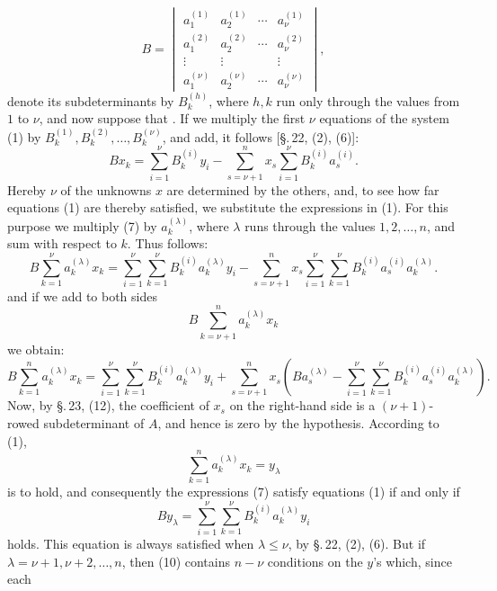 
\begin{equation}
        B=\begin{vmatrix}
        a_1^{(1)}&a_2^{(1)}&\cdots&a_\nu^{(1)}\\
        a_1^{(2)}&a_2^{(2)}&\cdots&a_\nu^{(2)}\\
        \vdots&\vdots&&\vdots\\
        a_1^{(\nu)}&a_2^{(\nu)}&\cdots&a_\nu^{(\nu)}
        \end{vmatrix},
\tag{6}
\end{equation}
denote its subdeterminants by \(B_k^{(h)}\), where \(h,k\) run only through the values from \(1\) to \(\nu\), and now suppose that . If we multiply the first \(\nu\) equations of the system (1) by \(B_k^{(1)},B_k^{(2)},\ldots,B_k^{(\nu)}\), and add, it follows [\S.\,22, (2), (6)]:
\begin{equation}
 Bx_k=\sum_{i=1}^{\nu}B_k^{(i)}y_i-
 \sum_{s=\nu+1}^{n}x_s\sum_{i=1}^{\nu}B_k^{(i)}a_s^{(i)}.
\tag{7}
\end{equation}
Hereby \(\nu\) of the unknowns \(x\) are determined by the others, and, to see how far equations (1) are thereby satisfied, we substitute the expressions in (1). For this purpose we multiply (7) by \(a_k^{(\lambda)}\), where \(\lambda\) runs through the values \(1,2,\ldots,n\), and sum with respect to \(k\). Thus follows:
\begin{equation}
 B\sum_{k=1}^{\nu}a_k^{(\lambda)}x_k
 =\sum_{i=1}^{\nu}\sum_{k=1}^{\nu}B_k^{(i)}a_k^{(\lambda)}y_i
 -\sum_{s=\nu+1}^{n}x_s\sum_{i=1}^{\nu}\sum_{k=1}^{\nu}B_k^{(i)}a_s^{(i)}a_k^{(\lambda)}.
\tag{8}
\end{equation}
and if we add to both sides
\[
 B\sum_{k=\nu+1}^{n}a_k^{(\lambda)}x_k
\]
we obtain:
\begin{equation}
 B\sum_{k=1}^{n}a_k^{(\lambda)}x_k
 =\sum_{i=1}^{\nu}\sum_{k=1}^{\nu}B_k^{(i)}a_k^{(\lambda)}y_i
 +\sum_{s=\nu+1}^{n}x_s\left(Ba_s^{(\lambda)}-
 \sum_{i=1}^{\nu}\sum_{k=1}^{\nu}B_k^{(i)}a_s^{(i)}a_k^{(\lambda)}\right).
\tag{9}
\end{equation}
Now, by \S.\,23, (12), the coefficient of \(x_s\) on the right-hand side is a \((\nu+1)\)-rowed subdeterminant of \(A\), and hence is zero by the hypothesis. According to (1),
\[
 \sum_{k=1}^{n}a_k^{(\lambda)}x_k=y_\lambda
\]
is to hold, and consequently the expressions (7) satisfy equations (1) if and only if
\begin{equation}
 B y_\lambda=\sum_{i=1}^{\nu}\sum_{k=1}^{\nu}B_k^{(i)}a_k^{(\lambda)}y_i
\tag{10}
\end{equation}
holds. This equation is always satisfied when \(\lambda\le\nu\), by \S.\,22, (2), (6). But if \(\lambda=\nu+1,\nu+2,\ldots,n\), then (10) contains \(n-\nu\) conditions on the \(y\)'s which, since each
